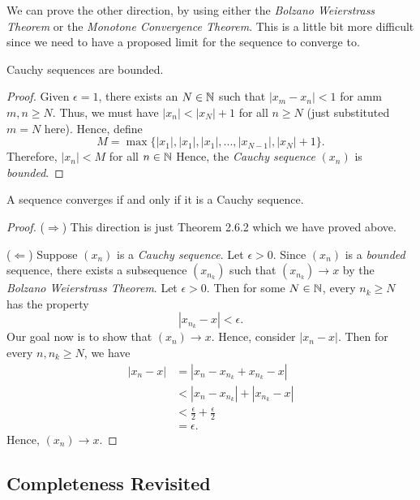 We can prove the other direction, by using either the \textit{Bolzano Weierstrass Theorem} or the \textit{Monotone Convergence Theorem}. This is a little bit more difficult since we need to have a proposed limit for the sequence to converge to.  
\begin{lemma}{}{}
Cauchy sequences are bounded.
\end{lemma}

\begin{proof}
    Given \( \epsilon = 1\), there exists an \( N \in \mathbb{N} \) such that \( |x_m - x_n | < 1 \) for amm \( m,n \geq N \). Thus, we must have \( |x_n| < |x_{N}| + 1 \) for all \( n \geq N \) (just substituted \(m = N \) here). Hence, define 
    \[ M = \max \{ |x_1|, |x_1|, |x_1|,..., |x_{N-1}|, |x_{N}| + 1 \}.\]
   Therefore, \( |x_n| < M \) for all \( n \in \mathbb{N} \) Hence, the \textit{Cauchy sequence} \((x_n)\) is \textit{bounded}.
\end{proof}

\begin{theorem}
A sequence converges if and only if it is a Cauchy sequence.
\end{theorem}

\begin{proof}
    (\(\Rightarrow\)) This direction is just Theorem 2.6.2 which we have proved above. 

    (\( \Leftarrow\)) Suppose \((x_n)\) is a \textit{Cauchy sequence}. Let \( \epsilon > 0 \). Since \( (x_n)\) is a \textit{bounded} sequence, there exists a subsequence \((x_{n_k})\) such that \((x_{n_k}) \to x \) by the \textit{Bolzano Weierstrass Theorem}. Let \( \epsilon > 0 \). Then for some \( N \in \mathbb{N} \), every \( n_k \geq N \) has the property
    \[ |x_{n_k} - x| < \epsilon.\]
Our goal now is to show that \( (x_n) \to x\). Hence, consider \( |x_n - x| \). Then for every \(n, n_{k} \geq N \), we have 
\begin{align*}
    |x_n - x | &= |x_n - x_{n_k} + x_{n_k} - x | \\
     &< |x_n - x_{n_k}| + |x_{n_k} - x| \\
     &< \frac{\epsilon}{2} + \frac{\epsilon}{2} \\
     &= \epsilon.
\end{align*}
Hence, \((x_n) \to x \).  
\end{proof}

\subsection{Completeness Revisited}

